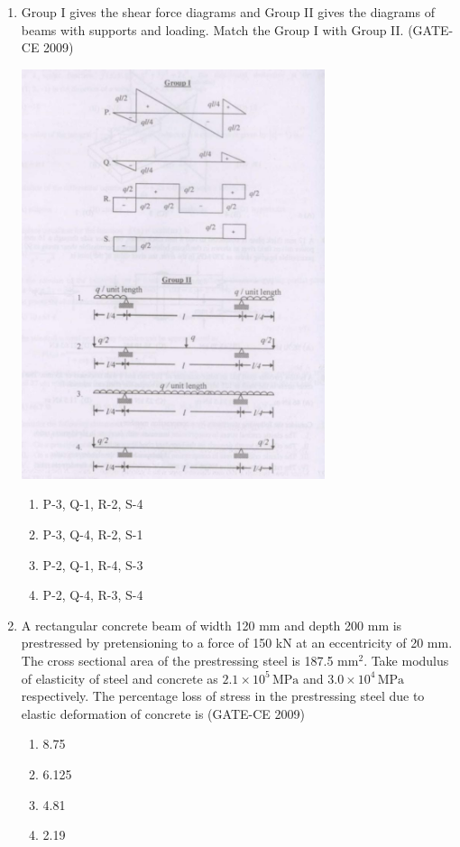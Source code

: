 \documentclass[12pt]{article}
\begin{document}
\begin{enumerate}[label=Q.\arabic*]
    \item Group I gives the shear force diagrams and Group II gives the diagrams of beams with supports and loading. Match the Group I with Group II. (GATE-CE 2009)
    \begin{center}
    \includegraphics[width=0.7\textwidth]{image3.jpg}
    \end{center}
    \begin{enumerate}[label=(\Alph*)]
        \item P-3, Q-1, R-2, S-4 
        \item P-3, Q-4, R-2, S-1 
        \item P-2, Q-1, R-4, S-3 
        \item P-2, Q-4, R-3, S-4
    \end{enumerate}
    
    \item A rectangular concrete beam of width 120 mm and depth 200 mm is prestressed by pretensioning to a force of 150 kN at an eccentricity of 20 mm. The cross sectional area of the prestressing steel is 187.5 mm$^2$. Take modulus of elasticity of steel and concrete as $2.1 \times 10^5\, \text{MPa}$ and $3.0 \times 10^4\, \text{MPa}$ respectively. The percentage loss of stress in the prestressing steel due to elastic deformation of concrete is (GATE-CE 2009)
    \begin{enumerate}[label=(\Alph*)]
        \item 8.75 
        \item 6.125 
        \item 4.81 
        \item 2.19
    \end{enumerate}
    

\end{enumerate}
\end{document}
